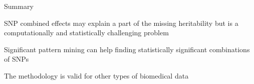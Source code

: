 \documentclass[ignorenonframetext,]{beamer}
\begin{document}
\begin{frame}{Summary}

SNP combined effects may explain a part of the missing heritability but
is a computationally and statistically challenging problem

Significant pattern mining can help finding statistically significant
combinations of SNPs

The methodology is valid for other types of biomedical data

\end{frame}
\end{document}
